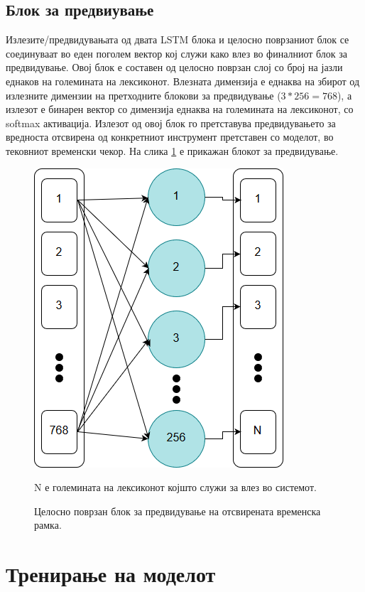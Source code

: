 \subsection{Блок за предвиување}

Излезите/предвидувањата од двата LSTM блока и целосно поврзаниот блок се соединуваат во еден поголем вектор кој служи како влез во финалниот блок за предвидување. Овој блок е составен од целосно поврзан слој со број на јазли еднаков на големината на лексиконот. Влезната димензија е еднаква на збирот од излезните димензии на претходните блокови за предвидување ($3*256=768$), а излезот е бинарен вектор со димензија еднаква на големината на лексиконот, со softmax активација. Излезот од овој блок го претставува предвидувањето за вредноста отсвирена од конкретниот инструмент претставен со моделот, во тековниот временски чекор. На слика \ref{fig:learner} е прикажан блокот за предвидување.

\begin{figure}[H]
	\centering
    \includegraphics[scale=0.5]{images/learner.png}
	\caption{Целосно поврзан блок за предвидување на отсвирената временска рамка.}
	N е големината на лексиконот којшто служи за влез во системот.
	\label{fig:learner}
\end{figure}

\section{Тренирање на моделот}

